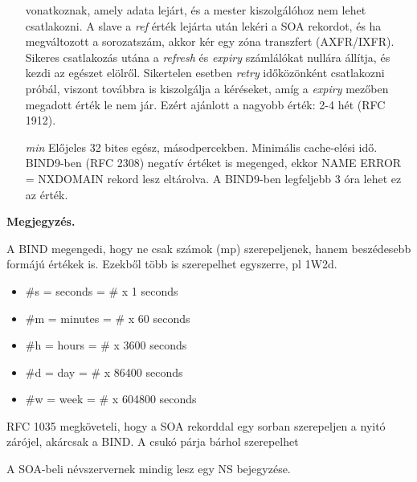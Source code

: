 \documentclass[fleqn,10pt,a4paper]{article}
\theoremstyle{magyar}
\newenvironment{megj}{\begin{trivlist}\item\relax\mbox{\textbf{Megjegyzés.\enskip}}\ignorespaces}{\end{trivlist}}
\begin{document}
\begin{enumerate}
    vonatkoznak, amely adata lejárt, és a mester kiszolgálóhoz nem lehet csatlakozni. A slave a \emph{ref} érték lejárta
    után lekéri a SOA rekordot, és ha megváltozott a sorozatszám, akkor kér egy zóna transzfert (AXFR/IXFR). Sikeres
    csatlakozás utána a \emph{refresh} és \emph{expiry} számlálókat nullára állítja, és kezdi az egészet
    elölről. Sikertelen esetben \emph{retry} időközönként csatlakozni próbál, viszont továbbra is kiszolgálja a
    kéréseket, amíg a \emph{expiry} mezőben megadott érték le nem jár. Ezért ajánlott a nagyobb érték: 2-4 hét (RFC 1912).
  \item[ {\it min}] Előjeles 32 bites egész, másodpercekben. Minimális cache-elési idő. BIND9-ben (RFC 2308) negatív
    értéket is megenged, ekkor NAME ERROR = NXDOMAIN rekord lesz eltárolva. A BIND9-ben legfeljebb 3 óra lehet ez az érték.
  \end{enumerate}

  \begin{megj}
  \item A BIND megengedi, hogy ne csak számok (mp) szerepeljenek, hanem beszédesebb formájú értékek is. Ezekből több
    is szerepelhet egyszerre, pl 1W2d. 
    \begin{itemize}
    \item \#s = seconds = \# x 1 seconds
    \item \#m = minutes = \# x 60 seconds
    \item \#h = hours = \# x 3600 seconds
    \item \#d = day = \# x 86400 seconds
    \item \#w = week = \# x 604800 seconds
    \end{itemize}
    
  \item RFC 1035 megköveteli, hogy a SOA rekorddal egy sorban szerepeljen a nyitó zárójel, akárcsak a BIND. A csukó
    párja bárhol szerepelhet
  \item A SOA-beli névszervernek mindig lesz egy NS bejegyzése.
  \end{megj}
\end{document}
